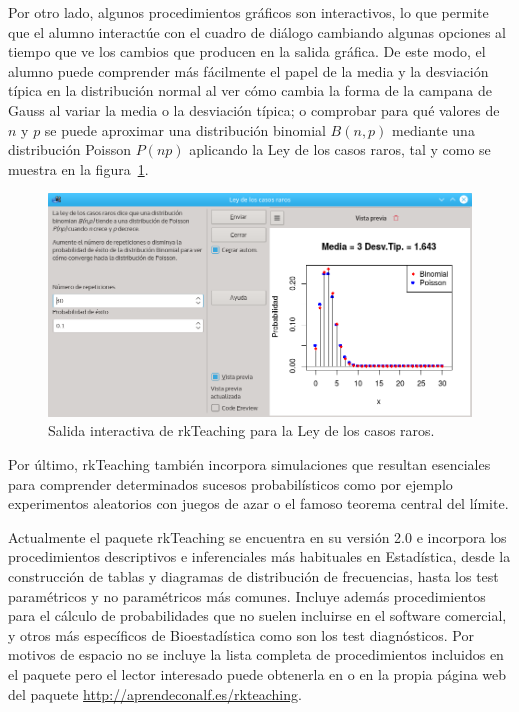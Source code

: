 \documentclass[a4paper,10pt,twoside]{article}
\newcommand{\rkteaching}{\textsf{rkTeaching}}
\begin{document}
\begin{description}
Por otro lado, algunos procedimientos gráficos son interactivos, lo que permite que el alumno interactúe con el cuadro
de diálogo cambiando algunas opciones al tiempo que ve los cambios que producen en la salida gráfica.
De este modo, el alumno puede comprender más fácilmente el papel de la media y la desviación típica en la distribución
normal al ver cómo cambia la forma de la campana de Gauss al variar la media o la desviación
típica; o comprobar para qué valores de $n$ y $p$ se puede aproximar una distribución binomial $B(n,p)$ mediante una
distribución Poisson $P(np)$ aplicando la Ley de los casos raros, tal y como se muestra en la
figura~\ref{f:ley-casos-raros}.

\begin{figure}[htp]
\begin{center}
\includegraphics[width=\textwidth]{img/ley_casos_raros.png}
\caption{Salida interactiva de \rkteaching{} para la Ley de los casos raros.}
\label{f:ley-casos-raros}
\end{center}
\end{figure}

Por último, \rkteaching{} también incorpora simulaciones que resultan esenciales para comprender determinados sucesos
probabilísticos como por ejemplo experimentos aleatorios con juegos de azar o el famoso teorema central del límite.  
\end{description}

Actualmente el paquete \rkteaching{} se encuentra en su versión 2.0 e incorpora los procedimientos descriptivos e
inferenciales más habituales en Estadística, desde la construcción de tablas y diagramas de distribución
de frecuencias, hasta los test paramétricos y no paramétricos más comunes. 
Incluye además procedimientos para el cálculo de probabilidades que no suelen incluirse en el software comercial, y
otros más específicos de Bioestadística como son los test diagnósticos. 
Por motivos de espacio no se incluye la lista completa de procedimientos incluidos en el paquete pero el lector
interesado puede obtenerla en \cite{sanchez2015bringing} o en la propia página web del paquete
\url{http://aprendeconalf.es/rkteaching}.
\end{document}
